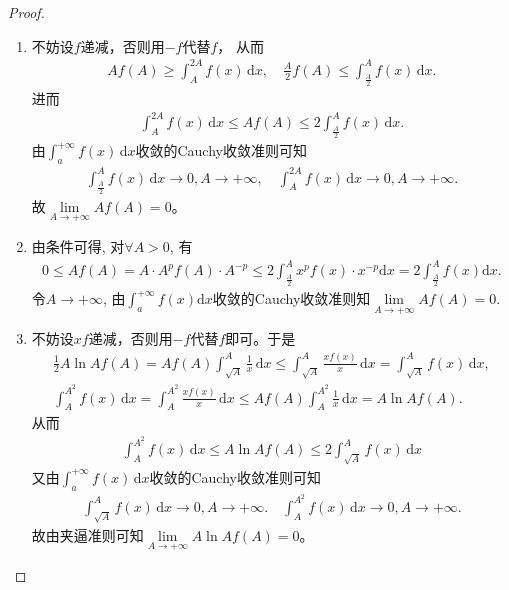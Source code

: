 \documentclass[../../main.tex]{subfiles}%
\begin{document}
\begin{proof}
\begin{enumerate}[(1)]
\item 不妨设\(f\)递减，否则用\(-f\)代替\(f\)，
从而
\begin{align*}
Af(A)\geqslant \int_A^{2A}{f(x)\,\mathrm{d}x},\quad \frac{A}{2}f(A)\leqslant \int_{\frac{A}{2}}^A{f(x)\,\mathrm{d}x.}
\end{align*}
进而
\begin{align*}
\int_A^{2A}{f(x)\,\mathrm{d}x}\leqslant Af(A)\leqslant 2\int_{\frac{A}{2}}^A{f(x)\,\mathrm{d}x}.
\end{align*}
由\(\int_a^{+\infty}{f(x)\,\mathrm{d}x}\)收敛的Cauchy收敛准则可知
\begin{align*}
\int_{\frac{A}{2}}^A{f(x)\,\mathrm{d}x}\rightarrow 0, A\rightarrow +\infty,  \quad
\int_A^{2A}{f(x)\,\mathrm{d}x}\rightarrow 0, A\rightarrow +\infty.
\end{align*}
故\(\lim\limits_{A\rightarrow+\infty}Af(A)=0\)。

\item 由条件可得, 对$\forall A>0$, 有
\begin{align*}
0\leqslant Af\left( A \right) =A\cdot A^pf\left( A \right) \cdot A^{-p}\leqslant 2\int_{\frac{A}{2}}^A{x^pf\left( x \right) \cdot x^{-p}\mathrm{d}x}=2\int_{\frac{A}{2}}^A{f\left( x \right) \mathrm{d}x}.
\end{align*}
令$A\rightarrow +\infty$, 由$\int_a^{+\infty}{f\left( x \right) \mathrm{d}x}$收敛的Cauchy收敛准则知$\lim\limits_{A\rightarrow +\infty}{Af\left( A \right)} =0$.

\item 不妨设\(xf\)递减，否则用\(-f\)代替\(f\)即可。于是
\begin{align*}
\frac{1}{2}A\ln A f(A) = Af(A)\int_{\sqrt{A}}^A\frac{1}{x}\,\mathrm{d}x 
\leqslant  \int_{\sqrt{A}}^A\frac{xf(x)}{x}\,\mathrm{d}x 
= \int_{\sqrt{A}}^A f(x)\,\mathrm{d}x,
\\ 
\int_A^{A^2} f(x)\,\mathrm{d}x = \int_A^{A^2}\frac{xf(x)}{x}\,\mathrm{d}x 
\leqslant  Af(A)\int_A^{A^2}\frac{1}{x}\,\mathrm{d}x 
= A\ln A f(A).
\end{align*}
从而
\begin{align*}
\int_A^{A^2} f(x)\,\mathrm{d}x \leqslant  A\ln A f(A) 
\leqslant  2\int_{\sqrt{A}}^A f(x)\,\mathrm{d}x
\end{align*}
又由\(\int_a^{+\infty} f(x)\,\mathrm{d}x\)收敛的Cauchy收敛准则可知
\begin{align*}
\int_{\sqrt{A}}^A f(x)\,\mathrm{d}x \to 0, A \to +\infty. \quad
\int_A^{A^2} f(x)\,\mathrm{d}x \to 0,  A \to +\infty.
\end{align*}
故由夹逼准则可知\(\lim\limits_{A \to +\infty}A\ln A f(A)=0\)。 
\end{enumerate}

\end{proof}
\end{document}
